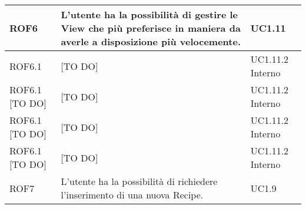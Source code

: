 \begin{center}
\begin{longtable}{| p{2cm} | p{8cm} | p{2cm} |}
		ROF6  & L'utente ha la possibilità di gestire le View che più preferisce in maniera da averle a disposizione più velocemente. & UC1.11 \\
		\hline
		ROF6.1  & [TO DO]  & UC1.11.2 \newline Interno \\
		\hline
		ROF6.1 [TO DO] & [TO DO]  & UC1.11.2 \newline Interno \\
		\hline
		ROF6.1 [TO DO] & [TO DO]  & UC1.11.2 \newline Interno \\
		\hline
		ROF6.1 [TO DO] & [TO DO]  & UC1.11.2 \newline Interno \\
		\hline


		ROF7  & L'utente ha la possibilità di richiedere l'inserimento di una nuova Recipe. & UC1.9 \\
		\hline









\end{longtable}
\end{center}
